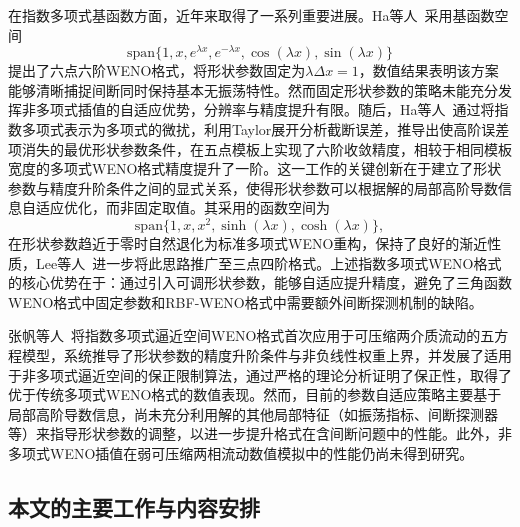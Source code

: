 \documentclass[12pt,a4paper]{article}
\numberwithin{equation}{section}    %
\begin{document}
在指数多项式基函数方面，近年来取得了一系列重要进展。Ha等人~\cite{Ha2016}采用基函数空间
\begin{equation}
    \mathrm{span}\{1, x, e^{\lambda x}, e^{-\lambda x}, \cos(\lambda x), \sin(\lambda x)\}
\end{equation}
提出了六点六阶WENO格式，将形状参数固定为$\lambda\Delta x = 1$，数值结果表明该方案能够清晰捕捉间断同时保持基本无振荡特性。然而固定形状参数的策略未能充分发挥非多项式插值的自适应优势，分辨率与精度提升有限。随后，Ha等人~\cite{Ha2021}通过将指数多项式表示为多项式的微扰，利用Taylor展开分析截断误差，推导出使高阶误差项消失的最优形状参数条件，在五点模板上实现了六阶收敛精度，相较于相同模板宽度的多项式WENO格式精度提升了一阶。这一工作的关键创新在于建立了形状参数与精度升阶条件之间的显式关系，使得形状参数可以根据解的局部高阶导数信息自适应优化，而非固定取值。其采用的函数空间为
\begin{equation}
    \mathrm{span}\{1, x, x^2, \sinh(\lambda x), \cosh(\lambda x)\},
\end{equation}
在形状参数趋近于零时自然退化为标准多项式WENO重构，保持了良好的渐近性质，Lee等人~\cite{Lee2023}进一步将此思路推广至三点四阶格式。上述指数多项式WENO格式的核心优势在于：通过引入可调形状参数，能够自适应提升精度，避免了三角函数WENO格式中固定参数和RBF-WENO格式中需要额外间断探测机制的缺陷。

张帆等人~\cite{Zhang2025exponential}将指数多项式逼近空间WENO格式首次应用于可压缩两介质流动的五方程模型，系统推导了形状参数的精度升阶条件与非负线性权重上界，并发展了适用于非多项式逼近空间的保正限制算法，通过严格的理论分析证明了保正性，取得了优于传统多项式WENO格式的数值表现。然而，目前的参数自适应策略主要基于局部高阶导数信息，尚未充分利用解的其他局部特征（如振荡指标、间断探测器等）来指导形状参数的调整，以进一步提升格式在含间断问题中的性能。此外，非多项式WENO插值在弱可压缩两相流动数值模拟中的性能仍尚未得到研究。


\subsection{本文的主要工作与内容安排}
\end{document}
